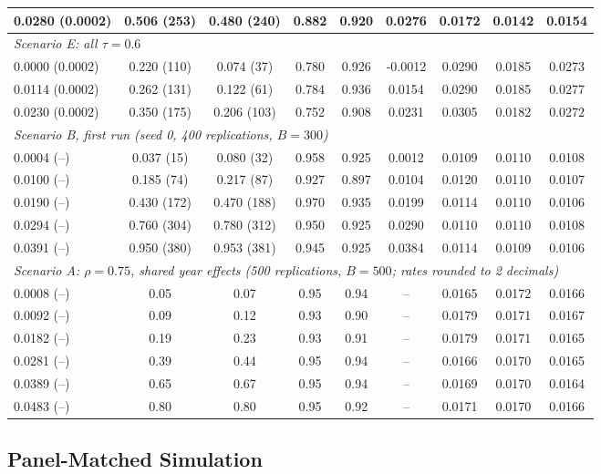 \documentclass[11pt,a4paper]{article}
\begin{document}
\begin{table}[H]
{{\begin{tabular}{lcccccccc}
0.0280 (0.0002) & 0.506 (253) & 0.480 (240) & 0.882 & 0.920 & 0.0276 & 0.0172 & 0.0142 & 0.0154 \\
\midrule
\multicolumn{9}{l}{\emph{Scenario E: all $\tau=0.6$}} \\
0.0000 (0.0002) & 0.220 (110) & 0.074 (37) & 0.780 & 0.926 & -0.0012 & 0.0290 & 0.0185 & 0.0273 \\
0.0114 (0.0002) & 0.262 (131) & 0.122 (61) & 0.784 & 0.936 & 0.0154 & 0.0290 & 0.0185 & 0.0277 \\
0.0230 (0.0002) & 0.350 (175) & 0.206 (103) & 0.752 & 0.908 & 0.0231 & 0.0305 & 0.0182 & 0.0272 \\
\midrule
\multicolumn{9}{l}{\emph{Scenario B, first run (seed 0, 400 replications, $B=300$)}} \\
0.0004 (--) & 0.037 (15) & 0.080 (32) & 0.958 & 0.925 & 0.0012 & 0.0109 & 0.0110 & 0.0108 \\
0.0100 (--) & 0.185 (74) & 0.217 (87) & 0.927 & 0.897 & 0.0104 & 0.0120 & 0.0110 & 0.0107 \\
0.0190 (--) & 0.430 (172) & 0.470 (188) & 0.970 & 0.935 & 0.0199 & 0.0114 & 0.0110 & 0.0106 \\
0.0294 (--) & 0.760 (304) & 0.780 (312) & 0.950 & 0.925 & 0.0290 & 0.0110 & 0.0110 & 0.0108 \\
0.0391 (--) & 0.950 (380) & 0.953 (381) & 0.945 & 0.925 & 0.0384 & 0.0114 & 0.0109 & 0.0106 \\
\midrule
\multicolumn{9}{l}{\emph{Scenario A: $\rho=0.75$, shared year effects (500 replications, $B=500$; rates rounded to 2 decimals)}} \\
0.0008 (--) & 0.05 & 0.07 & 0.95 & 0.94 & -- & 0.0165 & 0.0172 & 0.0166 \\
0.0092 (--) & 0.09 & 0.12 & 0.93 & 0.90 & -- & 0.0179 & 0.0171 & 0.0167 \\
0.0182 (--) & 0.19 & 0.23 & 0.93 & 0.91 & -- & 0.0179 & 0.0171 & 0.0165 \\
0.0281 (--) & 0.39 & 0.44 & 0.95 & 0.94 & -- & 0.0166 & 0.0170 & 0.0165 \\
0.0389 (--) & 0.65 & 0.67 & 0.95 & 0.94 & -- & 0.0169 & 0.0170 & 0.0164 \\
0.0483 (--) & 0.80 & 0.80 & 0.95 & 0.92 & -- & 0.0171 & 0.0170 & 0.0166 \\
\bottomrule
\end{tabular}%
}
}
\end{table}



\subsection{Panel-Matched Simulation}
\label{app:panel_matched}
\end{document}
